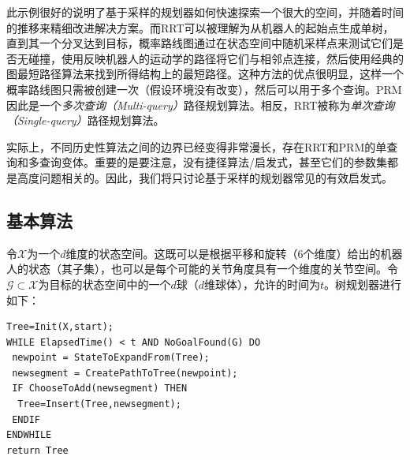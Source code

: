 此示例很好的说明了基于采样的规划器如何快速探索一个很大的空间，并随着时间的推移来精细改进解决方案。而RRT可以被理解为从机器人的起始点生成单树，直到其一个分叉达到目标，概率路线图通过在状态空间中随机采样点来测试它们是否无碰撞，使用反映机器人的运动学的路径将它们与相邻点连接，然后使用经典的图最短路径算法来找到所得结构上的最短路径。这种方法的优点很明显，这样一个概率路线图只需被创建一次（假设环境没有改变），然后可以用于多个查询。PRM因此是一个\emph{多次查询（Multi-query）}路径规划算法。相反，RRT被称为\emph{单次查询（Single-query）}路径规划算法。


实际上，不同历史性算法之间的边界已经变得非常漫长，存在RRT和PRM的单查询和多查询变体。重要的是要注意，没有捷径算法/启发式，甚至它们的参数集都是高度问题相关的。因此，我们将只讨论基于采样的规划器常见的有效启发式。

\subsection{基本算法}

令$\mathcal{X}$为一个$d$维度的状态空间。这既可以是根据平移和旋转（6个维度）给出的机器人的状态（其子集），也可以是每个可能的关节角度具有一个维度的关节空间。令$\mathcal{G}\subset\mathcal{X}$为目标的状态空间中的一个$d$球（$d$维球体），允许的时间为$t$。树规划器进行如下：

\begin{verbatim}
Tree=Init(X,start);
WHILE ElapsedTime() < t AND NoGoalFound(G) DO
 newpoint = StateToExpandFrom(Tree);
 newsegment = CreatePathToTree(newpoint);
 IF ChooseToAdd(newsegment) THEN
  Tree=Insert(Tree,newsegment);
 ENDIF
ENDWHILE
return Tree
\end{verbatim}


